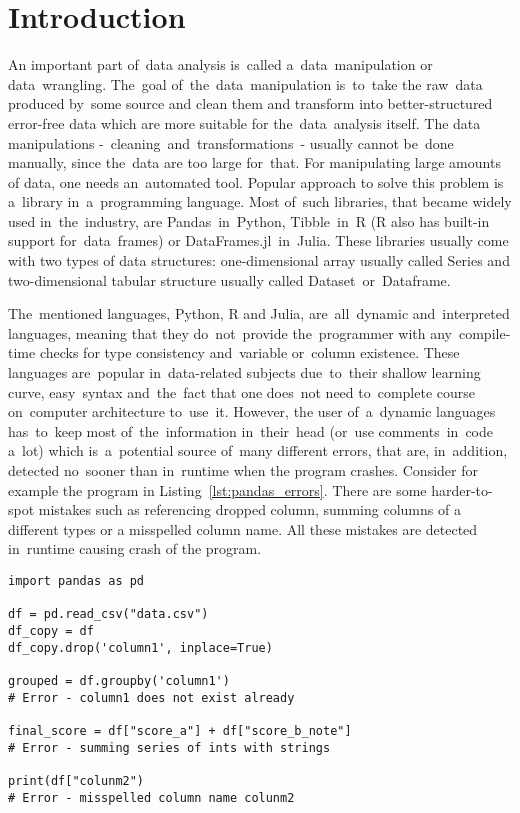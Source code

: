 \chapter*{Introduction}

An important part of~data analysis is~called a~data~manipulation or data~wrangling.
The~goal of~the~data~manipulation is~to~take the raw~data produced by~some source and clean them and transform into
better-structured error-free data which are more suitable for the~data~analysis itself.
The data manipulations -~cleaning~and~transformations~- usually cannot be~done manually, since the~data are too large
for~that.
For manipulating large amounts of data, one needs an~automated tool.
Popular approach to solve this problem is a~library in~a~programming language.
Most of~such libraries, that became widely used in~the~industry, are Pandas~in~Python\cite{pandas_docs},
Tibble~in~R\cite{tibble} (R also has built-in
support for~data~frames\cite{R-base}) or DataFrames.jl~in~Julia\cite{DataFrames.jl}.
These libraries usually come with two types of data structures: one-dimensional array usually called Series
and two-dimensional tabular structure usually called Dataset~or~Dataframe.

The~mentioned languages, Python, R and Julia, are~all~dynamic and~interpreted languages, meaning that they do~not~provide
the~programmer with any~compile-time checks for type consistency and~variable or~column existence.
These languages are~popular in~data-related subjects due~to~their shallow learning curve, easy~syntax and~the~fact that
one does~not need to~complete course on~computer architecture to~use~it.
However, the user of~a~dynamic languages has~to~keep most of~the~information in~their~head (or~use comments~in~code a~lot)
which is~a~potential source of~many different errors, that are, in~addition, detected no~sooner than in~runtime when
the program crashes.
Consider for example the program in Listing~\ref{lst:pandas_errors}.
There are some harder-to-spot mistakes such as referencing dropped column, summing columns of a different types
or a misspelled column name.
All these mistakes are detected in~runtime causing crash of the program.

\begin{lstlisting}[caption=Pandas code with errors, label={lst:pandas_errors}, captionpos=b]
import pandas as pd

df = pd.read_csv("data.csv")
df_copy = df
df_copy.drop('column1', inplace=True)

grouped = df.groupby('column1')
# Error - column1 does not exist already

final_score = df["score_a"] + df["score_b_note"]
# Error - summing series of ints with strings

print(df["colunm2")
# Error - misspelled column name colunm2

\end{lstlisting}

